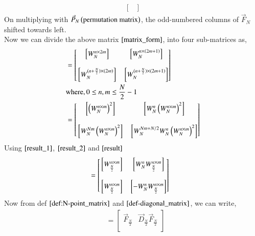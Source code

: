 \documentclass[journal,12pt,twocolumn]{IEEEtran}
\renewcommand\thesection{\arabic{section}}
\begin{document}
\begin{enumerate}[label=\arabic*.,ref=\thesection.\theenumi]
\begin{align}
\begin{bmatrix}
                               \end{bmatrix}
     \label{matrix_form}
    \end{align}
    On multiplying with $\vec{P}_{N} \left(\text{permutation matrix}\right)$, the odd-numbered columns of $\vec{F}_{N}$ shifted towards left.\\
     Now we can divide the above matrix $\eqref{matrix_form}$, into four sub-matrices as,
       \begin{align}
                    & = \begin{bmatrix}
                           {}\left[W_{N}^{n\times 2m}\right] & {}\left[W_{N}^{n\times\left(2m + 1\right)}\right] \\ \\
                           {}\left[W_{N}^{(n + \frac{N}{2}) \times (2m) }\right] & {}\left[W_{N}^{(n + \frac{N}{2}) \times (2m + 1)}\right]
                        \end{bmatrix}\\
                   & \text{where}, 0 \leq n,m \leq \frac{N}{2} - 1 \nonumber \\
                   & = \begin{bmatrix}
                             {}\left[\left(W_{N}^{n\times m}\right)^2\right] & {}\left[W_{N}^{n}\left(W_{N}^{n\times m}\right)^2\right] \\ \\
                         {}\left[W_{N}^{Nm}\left(W_{N}^{n \times m}\right)^2\right] & {}\left[W_{N}^{Nm + N/2}W_{N}^{n}\left(W_{N}^{n \times m}\right)^2\right]
                        \end{bmatrix}
       \end{align}
    Using $\eqref{result_1}$, $\eqref{result_2}$ and $\eqref{result}$
     \begin{align}
         & =  \begin{bmatrix}
                  {}\left[W_{\frac{N}{2}}^{n\times m}\right] & {}\left[W_{N}^{n}W_{\frac{N}{2}}^{n\times m}\right]\\ \\
                  {}\left[W_{\frac{N}{2}}^{n\times m}\right] & {}\left[-W_{N}^{n}W_{\frac{N}{2}}^{n\times m}\right]
              \end{bmatrix}
     \end{align}
    Now from def $\eqref{def:N-point_matrix}$ and $\eqref{def-diagonal_matrix}$, we can write,
      \begin{align}
           & =  \begin{bmatrix}
                  \vec{F}_{\frac{N}{2}} &\vec{D}_{\frac{N}{2}}\vec{F}_{\frac{N}{2}}\\

\end{bmatrix}
\end{align}
\end{enumerate}
\end{document}
